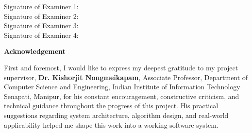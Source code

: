 \documentclass[a4paper, 12pt, oneside]{report}
\begin{document}
\vspace{0.2cm}
Signature of Examiner 1: \dotfill\\[0.45cm]
Signature of Examiner 2: \dotfill\\[0.45cm]
Signature of Examiner 3: \dotfill\\[0.45cm]
Signature of Examiner 4: \dotfill
\newpage

\begin{abstract}
Rapid expansion in online grocery commerce has exposed critical inefficiencies in conventional single-store platforms, where consumers cannot easily optimize baskets across competing merchants or negotiate bulk custom orders. This project presents \textbf{GroDealz}, an intelligent multi-store grocery basket optimizer and merchant quotation platform built on the MERN stack (MongoDB, Express.js, React 18, Node.js) and a Python LangGraph autonomous agent service. GroDealz introduces an Autonomous AI Shopping Agent that parses unstructured natural language constraints, queries local store inventories, and computes cost-optimal single-store and multi-store split itineraries with delivery fee audits. In parallel, a Reverse Request for Quotation (RFQ) marketplace empowers buyers to publish custom purchase demands and receive competitive, itemized quotations from nearby independent kirana stores. The system also integrates hybrid product recommendations, demand forecasting, real-time WebSocket communication, and an automated customer support CRM, delivering a unified, scalable digital commerce solution.
\end{abstract}

\pagebreak

\begin{center}
    {\LARGE \textbf{Acknowledgement}}
\end{center}
\vspace{1cm}

First and foremost, I would like to express my deepest gratitude to my project supervisor, \textbf{Dr. Kishorjit Nongmeikapam}, Associate Professor, Department of Computer Science and Engineering, Indian Institute of Information Technology Senapati, Manipur, for his constant encouragement, constructive criticism, and technical guidance throughout the progress of this project. His practical suggestions regarding system architecture, algorithm design, and real-world applicability helped me shape this work into a working software system.
\end{document}
